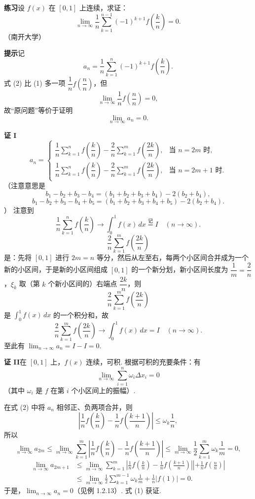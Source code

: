 \documentclass[UTF8,12pt,a4paper,fontset=fandol]{ctexart}
\begin{document}
\noindent\textbf{练习}\quad 设 $f(x)$ 在 $[0,1]$ 上连续，求证：
\[
\lim_{n\to\infty}\frac1n\sum_{k=1}^{n-1}(-1)^{k+1}f\left(\frac kn\right)=0.
\tag{1}
\]
（南开大学）

\noindent\textbf{提示}\quad 记
\[
a_n=\frac1n\sum_{k=1}^n(-1)^{k+1}f\left(\frac kn\right).
\tag{2}
\]
式 (2) 比 (1) 多一项 $\dfrac1n f\left(\dfrac nn\right)$，但
\[
\lim_{n\to\infty}\frac1n f\left(\frac nn\right)=0,
\]
故“原问题”等价于证明
\[
\lim_{n\to\infty}a_n=0.
\]

\noindent\textbf{证 I}\quad
\[
a_n=
\begin{cases}
\dfrac1n\displaystyle\sum_{k=1}^n f\left(\dfrac kn\right)
-\dfrac2n\displaystyle\sum_{k=1}^m f\left(\dfrac{2k}{n}\right),
&\text{当 }n=2m\text{ 时},\\[1.2em]
\dfrac1n\displaystyle\sum_{k=1}^n f\left(\dfrac kn\right)
-\dfrac2n\displaystyle\sum_{k=1}^m f\left(\dfrac{2k}{n}\right),
&\text{当 }n=2m+1\text{ 时}.
\end{cases}
\]
（注意意思是
\[
b_1-b_2+b_3-b_4=(b_1+b_2+b_3+b_4)-2(b_2+b_4),
\]
\[
b_1-b_2+b_3-b_4+b_5=(b_1+b_2+b_3+b_4+b_5)-2(b_2+b_4).
\]
）
注意到
\[
\frac1n\sum_{k=1}^n f\left(\frac kn\right)\to\int_0^1f(x)\,dx\stackrel{\text{记}}{=}I
\quad(n\to\infty).
\]
\[
\frac2n\sum_{k=1}^m f\left(\frac{2k}{n}\right)
\]
是：先将 $[0,1]$ 进行 $2m=n$ 等分，然后从左至右，每两个小区间合并成为一个新的小区间，于是新的小区间组成 $[0,1]$ 的一个新分划，新小区间长度为 $\dfrac1m=\dfrac2n$，$\xi_k$ 取（第 $k$ 个新小区间的）右端点 $\dfrac{2k}{n}$，则
\[
\frac2n\sum_{k=1}^m f\left(\frac{2k}{n}\right)
\]
是 $\displaystyle\int_0^1f(x)\,dx$ 的一个积分和，故
\[
\frac2n\sum_{k=1}^m f\left(\frac{2k}{n}\right)\to\int_0^1f(x)\,dx=I
\quad(n\to\infty).
\]
至此有 $\displaystyle\lim_{n\to\infty}a_n=I-I=0$.

\noindent\textbf{证 II}\quad 在 $[0,1]$ 上，$f(x)$ 连续，可积. 根据可积的充要条件：有
\[
\lim_{n\to\infty}\sum_{i=1}^n\omega_i\Delta x_i=0
\]
（其中 $\omega_i$ 是 $f$ 在第 $i$ 个小区间上的振幅）.

在式 (2) 中将 $a_n$ 相邻正、负两项合并，则
\[
\left|\frac1n f\left(\frac kn\right)-\frac1n f\left(\frac{k+1}{n}\right)\right|
\le\omega_k\frac1n,
\]
所以
\[
\lim_{n\to\infty}a_{2m}
\le \lim_{m\to\infty}\sum_{k=1}^m
\left|\frac1n f\left(\frac kn\right)-\frac1n f\left(\frac{k+1}{n}\right)\right|
\le \lim_{m\to\infty}\frac12\sum_{k=1}^m\omega_k\frac1m=0,
\]
\[
\begin{aligned}
\lim_{n\to\infty}a_{2m+1}
&\le \lim_{m\to\infty}\sum_{k=1}^m
\left|\frac1n f\left(\frac kn\right)-\frac1n f\left(\frac{k+1}{n}\right)\right|
\left|+\frac1n f\left(\frac nn\right)\right|\\
&\le \lim_{m\to\infty}\frac12\sum_{k=1}^{m-1}\omega_k\frac1m
+\frac1n|f(1)|=0.
\end{aligned}
\]
于是，$\displaystyle\lim_{n\to\infty}a_n=0$（见例 1.2.13）. 式 (1) 获证.
\end{document}
